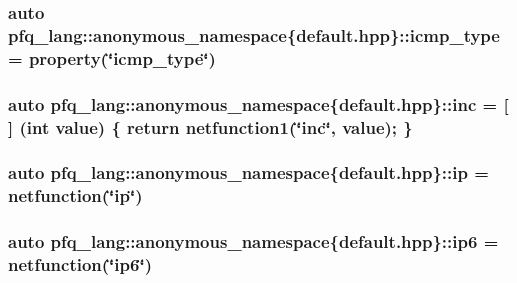 \hypertarget{namespacepfq__lang_1_1anonymous__namespace_02default_8hpp_03_a4adff7ced08caa2d0016a911dae6d2ed}{
\subsubsection[{icmp\-\_\-type}]{\setlength{\rightskip}{0pt plus 5cm}auto pfq\-\_\-lang\-::anonymous\-\_\-namespace\{default.\-hpp\}\-::icmp\-\_\-type = {\bf property}(\char`\"{}icmp\-\_\-type\char`\"{})}}\label{namespacepfq__lang_1_1anonymous__namespace_02default_8hpp_03_a4adff7ced08caa2d0016a911dae6d2ed}
\hypertarget{namespacepfq__lang_1_1anonymous__namespace_02default_8hpp_03_a14246183085ec07f08ab9b0d53907ae5}{
\subsubsection[{inc}]{\setlength{\rightskip}{0pt plus 5cm}auto pfq\-\_\-lang\-::anonymous\-\_\-namespace\{default.\-hpp\}\-::inc = \mbox{[}$\,$\mbox{]} (int value) \{ return {\bf netfunction1}(\char`\"{}inc\char`\"{}, value); \}}}\label{namespacepfq__lang_1_1anonymous__namespace_02default_8hpp_03_a14246183085ec07f08ab9b0d53907ae5}
\hypertarget{namespacepfq__lang_1_1anonymous__namespace_02default_8hpp_03_a27d30e7744c84a7cdc41a710ee16b885}{
\subsubsection[{ip}]{\setlength{\rightskip}{0pt plus 5cm}auto pfq\-\_\-lang\-::anonymous\-\_\-namespace\{default.\-hpp\}\-::ip = {\bf netfunction}(\char`\"{}ip\char`\"{})}}\label{namespacepfq__lang_1_1anonymous__namespace_02default_8hpp_03_a27d30e7744c84a7cdc41a710ee16b885}
\hypertarget{namespacepfq__lang_1_1anonymous__namespace_02default_8hpp_03_a566cbe8627dd2ae05071690ef64dbd12}{
\subsubsection[{ip6}]{\setlength{\rightskip}{0pt plus 5cm}auto pfq\-\_\-lang\-::anonymous\-\_\-namespace\{default.\-hpp\}\-::ip6 = {\bf netfunction}(\char`\"{}ip6\char`\"{})}}\label{namespacepfq__lang_1_1anonymous__namespace_02default_8hpp_03_a566cbe8627dd2ae05071690ef64dbd12}
